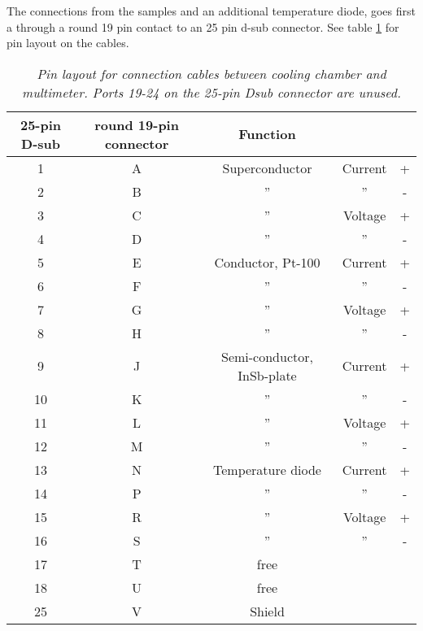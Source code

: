 \documentclass[a4paper,12pt]{article}
\begin{document}
The connections from the samples and an additional temperature diode, goes first a through a round 19 pin contact to an 25 pin d-sub connector. See table \ref{tab:PinNumbers} for pin layout on the cables.

\begin{table}
	\label{tab:PinNumbers}
  \caption{\emph{Pin layout for connection cables between cooling chamber and multimeter. Ports 19-24 on the 25-pin Dsub connector are  unused.}} 
  
  \begin{tabular}{c|c|c c c}
  25-pin D-sub & round 19-pin connector & Function & & \\
  \hline
  1  & A & Superconductor    & Current & + \\
  2  & B & ''                & ''      & - \\
  3  & C & ''                & Voltage & + \\
  4  & D & ''                & ''      & - \\
  5  & E & Conductor, Pt-100            & Current & + \\
  6  & F & ''                & ''      & - \\
  7  & G & ''                & Voltage & + \\
  8  & H & ''                & ''      & - \\
  9  & J & Semi-conductor, InSb-plate        & Current & + \\
  10 & K & ''                & ''      & - \\
  11 & L & ''                & Voltage & + \\
  12 & M & ''                & ''      & - \\
  13 & N & Temperature diode & Current & + \\
  14 & P & ''                & ''      & - \\
  15 & R & ''                & Voltage & + \\
  16 & S & ''                & ''      & - \\   
  17 & T & free              &         &  \\
  18 & U & free              &         &  \\
  25 & V & Shield            &         &  \\ 
  \end{tabular}
\end{table} 
\end{document}
